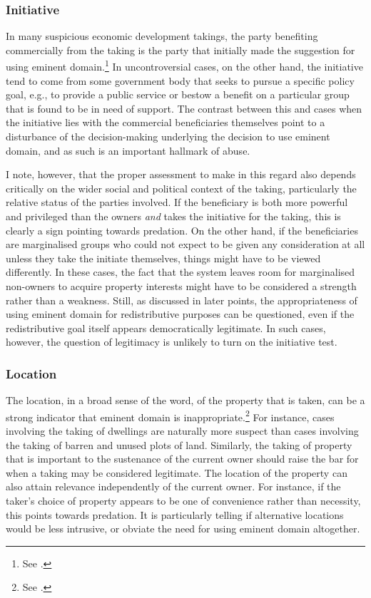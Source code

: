 \subsubsection*{Initiative}

In many suspicious economic development takings, the party benefiting commercially from the taking is the party that initially made the suggestion for using eminent domain.\footnote{See \cite[32]{gray11}.} In uncontroversial cases, on the other hand, the initiative tend to come from some government body that seeks to pursue a specific policy goal, e.g., to provide a public service or bestow a benefit on a particular group that is found to be in need of support. The contrast between this and cases when the initiative lies with the commercial beneficiaries themselves point to a disturbance of the decision-making underlying the decision to use eminent domain, and as such is an important hallmark of abuse.

I note, however, that the proper assessment to make in this regard also depends critically on the wider social and political context of the taking, particularly the relative status of the parties involved. If the beneficiary is both more powerful and privileged than the owners {\it and} takes the initiative for the taking, this is clearly a sign pointing towards predation. On the other hand, if the beneficiaries are marginalised groups who could not expect to be given any consideration at all unless they take the initiate themselves, things might have to be viewed differently. In these cases, the fact that the system leaves room for marginalised non-owners to acquire property interests might have to be considered a strength rather than a weakness. Still, as discussed in later points, the appropriateness of using eminent domain for redistributive purposes can be questioned, even if the redistributive goal itself appears democratically legitimate. In such cases, however, the question of legitimacy is unlikely to turn on the initiative test.

\subsubsection*{Location}

The location, in a broad sense of the word, of the property that is taken, can be a strong indicator that eminent domain is inappropriate.\footnote{See \cite[33-34]{gray11}.} For instance, cases involving the taking of dwellings are naturally more suspect than cases involving the taking of barren and unused plots of land. Similarly, the taking of property that is important to the sustenance of the current owner should raise the bar for when a taking may be considered legitimate. The location of the property can also attain relevance independently of the current owner. For instance, if the taker's choice of property appears to be one of convenience rather than necessity, this points towards predation. It is particularly telling if alternative locations would be less intrusive, or obviate the need for using eminent domain altogether.

